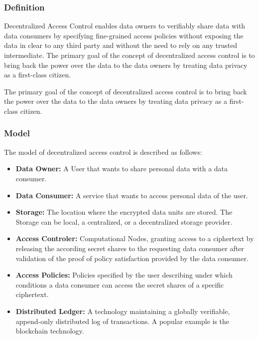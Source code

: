 \documentclass[conference]{IEEEtran}
\begin{document}
\subsubsection{Definition}
Decentralized Access Control enables data owners to verifiably share data with data consumers by specifying fine-grained access policies without exposing the data in clear to any third party and without the need to rely on any trusted intermediate.
The primary goal of the concept of decentralized access control is to bring back the power over the data to the data owners by treating data privacy as a first-class citizen. \cite{ernstberger_sok_2023}

The primary goal of the concept of decentralized access control is to bring back the power over the data to the data owners by treating data privacy as a first-class citizen.

\subsubsection{Model}

The model of decentralized access control is described as follows:

\begin{itemize}
  \item \textbf{Data Owner:} A User that wants to share personal data with a data consumer.
  \item \textbf{Data Consumer:} A service that wants to access personal data of the user.
  \item \textbf{Storage:} The location where the encrypted data units are stored.
  The Storage can be local, a centralized, or a decentralized storage provider.
  \item \textbf{Access Controler:} Computational Nodes, granting access to a ciphertext by releasing the according secret shares to the requesting data consumer after validation of the proof of policy satisfaction provided by the data consumer.
  \item \textbf{Access Policies:} Policies specified by the user describing under which conditions a data consumer can access the secret shares of a specific ciphertext.
  \item \textbf{Distributed Ledger:} A technology maintaining a globally verifiable, append-only distributed log of transactions. A popular example is the blockchain technology. 
\end{itemize}
\end{document}
